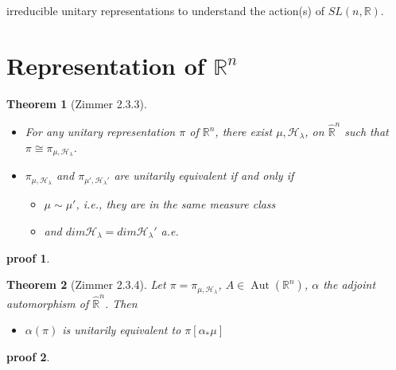 \documentclass[
  12pt
]{article}
\theoremstyle{break}
\newtheorem{thm}{Theorem}
\theoremstyle{plain}
\newtheorem*{pf}{proof}
\newcommand{\bbr}{\ensuremath{\mathbb{R}}}
\newcommand{\hilb}{\ensuremath{\mathscr{H}}}
\DeclareMathOperator{\Aut}{Aut}
\begin{document}
  irreducible unitary representations to understand the action(s) of
  $SL(n, \mathbb{R})$.










\hypertarget{representation-of-rn}{%
\section{Representation of \texorpdfstring{$\bbr^n$}{R\^{}n}}\label{representation-of-rn}}

  \begin{thm}[Zimmer 2.3.3]
    \label{thm:2.3.3}
    \begin{itemize}
      \item For any unitary representation $\pi$ of
        $\mathbb{R}^n$, there exist $\mu, \mathscr{H}_{\lambda}$, on
        $\hat{\mathbb{R}}^n$ such that $\pi \cong \pi_{\mu, \mathscr{H}_{\lambda}}$.
      \item $\pi_{\mu, \mathscr{H}_{\lambda}}$ and
        $\pi_{\mu', \mathscr{H}_{\lambda}'}$ are unitarily equivalent if and only if 
        \begin{itemize}
          \item $\mu \sim \mu'$, i.e., they are in the same measure class
          \item and $dim\mathscr{H}_{\lambda} = dim \mathscr{H}_{\lambda}'$ a.e.
        \end{itemize}
    \end{itemize}
  \end{thm}

  \begin{pf}
    \label{pf2.3.3}
  \end{pf}

  \begin{thm}[Zimmer 2.3.4]
    \label{thm:2.3.4}
    Let $\pi = \pi_{\mu, \hilb_{\lambda}}$, $A\in  \Aut(\bbr^n)$, $\alpha$ the
    adjoint automorphism of $\hat{\bbr}^n$. Then
    \begin{itemize}
      \item $\alpha(\pi)$ is unitarily equivalent to $\pi[\alpha_*\mu]$
    \end{itemize}
  \end{thm}

  \begin{pf}
    \label{pf:2.3.4}
  \end{pf}
\end{document}
